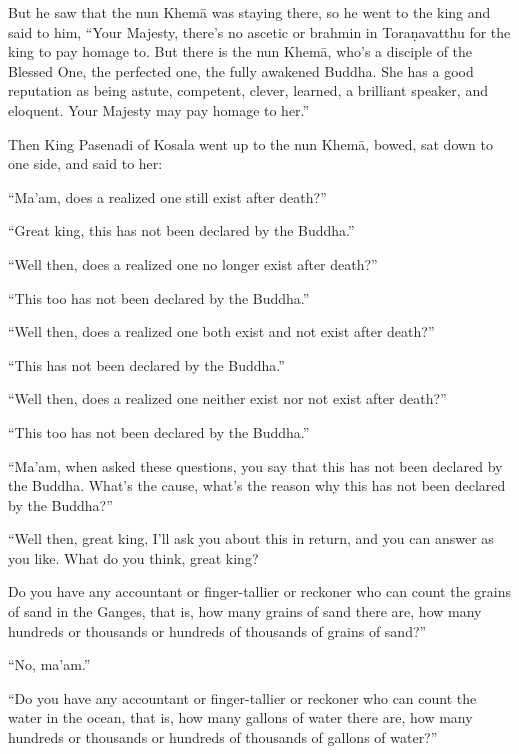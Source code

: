 \documentclass[12pt,openany]{book}%
\begin{document}
But he saw that the nun \textsanskrit{Khemā} was staying there, so he went to the king and said to him, “Your Majesty, there’s no ascetic or brahmin in \textsanskrit{Toraṇavatthu} for the king to pay homage to. But there is the nun \textsanskrit{Khemā}, who’s a disciple of the Blessed One, the perfected one, the fully awakened Buddha. She has a good reputation as being astute, competent, clever, learned, a brilliant speaker, and eloquent. Your Majesty may pay homage to her.” 

Then King Pasenadi of Kosala went up to the nun \textsanskrit{Khemā}, bowed, sat down to one side, and said to her: 

“Ma’am, does a realized one still exist after death?” 

“Great king, this has not been declared by the Buddha.” 

“Well then, does a realized one no longer exist after death?” 

“This too has not been declared by the Buddha.” 

“Well then, does a realized one both exist and not exist after death?” 

“This has not been declared by the Buddha.” 

“Well then, does a realized one neither exist nor not exist after death?” 

“This too has not been declared by the Buddha.” 

“Ma’am, when asked these questions, you say that this has not been declared by the Buddha. What’s the cause, what’s the reason why this has not been declared by the Buddha?” 

“Well then, great king, I’ll ask you about this in return, and you can answer as you like. What do you think, great king? 

Do you have any accountant or finger-tallier or reckoner who can count the grains of sand in the Ganges, that is, how many grains of sand there are, how many hundreds or thousands or hundreds of thousands of grains of sand?” 

“No, ma’am.” 

“Do you have any accountant or finger-tallier or reckoner who can count the water in the ocean, that is, how many gallons of water there are, how many hundreds or thousands or hundreds of thousands of gallons of water?” 
\end{document}
